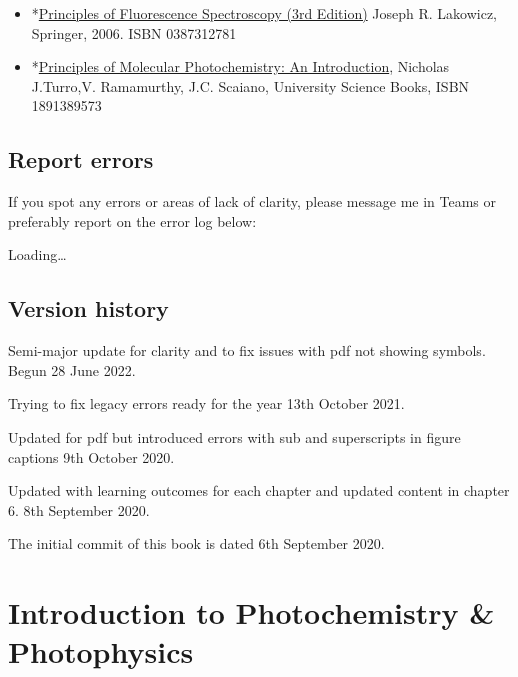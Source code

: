 \documentclass[
]{book}
\begin{document}
\begin{itemize}
\item
  *\href{https://link.springer.com/book/10.1007/978-0-387-46312-4}{Principles of Fluorescence Spectroscopy (3rd Edition)} Joseph R. Lakowicz, Springer, 2006. ISBN 0387312781
\item
  *\href{https://bath-ac-primo.hosted.exlibrisgroup.com/primo-explore/fulldisplay?docid=44BAT_ALMA_DS2129552010002761\&context=L\&vid=44BAT_VU1\&lang=en_US\&search_scope=CSCOP_44BAT_DEEP\&adaptor=Local\%20Search\%20Engine\&tab=local\&query=any,contains,principles\%20of\%20molecular\%20photochemistry\%20ramamurthy\&offset=0\&pcAvailability=false}{Principles of Molecular Photochemistry: An Introduction}, Nicholas J.Turro,V. Ramamurthy, J.C. Scaiano, University Science Books, ISBN 1891389573
\end{itemize}

\hypertarget{report-errors}{%
\section{Report errors}\label{report-errors}}

If you spot any errors or areas of lack of clarity, please message me in Teams or preferably report on the error log below:

Loading\ldots{}

\hypertarget{version-history}{%
\section*{Version history}\label{version-history}}

Semi-major update for clarity and to fix issues with pdf not showing symbols. Begun 28 June 2022.

Trying to fix legacy errors ready for the year 13th October 2021.

Updated for pdf but introduced errors with sub and superscripts in figure captions 9th October 2020.

Updated with learning outcomes for each chapter and updated content in chapter 6. 8th September 2020.

The initial commit of this book is dated 6th September 2020.

\hypertarget{chIntro}{%
\chapter{Introduction to Photochemistry \& Photophysics}\label{chIntro}}
\end{document}
